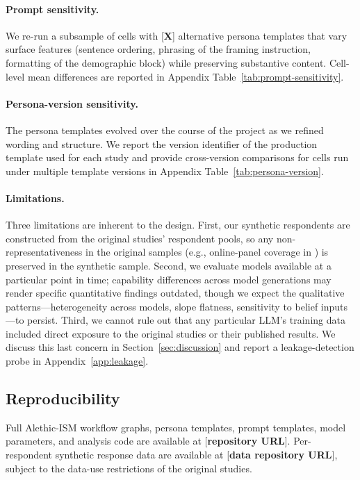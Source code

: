 \documentclass[12pt]{article}
\begin{document}
\paragraph{Prompt sensitivity.} We re-run a subsample of cells with
[\textbf{X}] alternative persona templates that vary surface features
(sentence ordering, phrasing of the framing instruction, formatting of
the demographic block) while preserving substantive content. Cell-level
mean differences are reported in Appendix Table~\ref{tab:prompt-sensitivity}.

\paragraph{Persona-version sensitivity.} The persona templates evolved
over the course of the project as we refined wording and structure. We
report the version identifier of the production template used for each
study and provide cross-version comparisons for cells run under multiple
template versions in Appendix Table~\ref{tab:persona-version}.

\paragraph{Limitations.} Three limitations are inherent to the design.
First, our synthetic respondents are constructed from the original
studies' respondent pools, so any non-representativeness in the original
samples (e.g., online-panel coverage in \textcite{Giguere2020}) is
preserved in the synthetic sample. Second, we evaluate models available
at a particular point in time; capability differences across model
generations may render specific quantitative findings outdated, though
we expect the qualitative patterns---heterogeneity across models, slope
flatness, sensitivity to belief inputs---to persist. Third, we cannot
rule out that any particular LLM's training data included direct
exposure to the original studies or their published results. We discuss
this last concern in Section~\ref{sec:discussion} and report a
leakage-detection probe in Appendix~\ref{app:leakage}.

\subsection{Reproducibility}\label{sec:methods-reproducibility}

Full Alethic-ISM workflow graphs, persona templates, prompt templates,
model parameters, and analysis code are available at
[\textbf{repository URL}]. Per-respondent synthetic response data are
available at [\textbf{data repository URL}], subject to the data-use
restrictions of the original studies.
\end{document}
